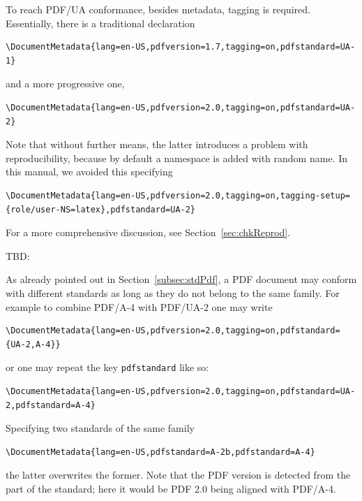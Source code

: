 To reach PDF/UA conformance, besides metadata, tagging is required. 
Essentially, there is a traditional declaration 
%
\begin{Verbatim}[fontsize=\small]
\DocumentMetadata{lang=en-US,pdfversion=1.7,tagging=on,pdfstandard=UA-1}
\end{Verbatim}
%
and a more progressive one, 
%
\begin{Verbatim}[fontsize=\small]
\DocumentMetadata{lang=en-US,pdfversion=2.0,tagging=on,pdfstandard=UA-2}
\end{Verbatim}

Note that without further means, the latter introduces a problem with reproducibility, 
because by default a namespace is added with random name. 
In this manual, we avoided this specifying 
%
\begin{Verbatim}[fontsize=\small]
\DocumentMetadata{lang=en-US,pdfversion=2.0,tagging=on,tagging-setup={role/user-NS=latex},pdfstandard=UA-2}
\end{Verbatim}
%
For a more comprehensive discussion, see Section~\ref{sec:chkReprod}. 


TBD\@: 


As already pointed out in Section~\ref{subsec:stdPdf}, 
a PDF document may conform with different standards 
as long as they do not belong to the same family. 
For example to combine PDF/A-4 with PDF/UA-2 one may write 
%
\begin{Verbatim}[fontsize=\small]
\DocumentMetadata{lang=en-US,pdfversion=2.0,tagging=on,pdfstandard={UA-2,A-4}}
\end{Verbatim}
%
or one may repeat the key \texttt{pdfstandard} like so: 
%
\begin{Verbatim}[fontsize=\small]
\DocumentMetadata{lang=en-US,pdfversion=2.0,tagging=on,pdfstandard=UA-2,pdfstandard=A-4}
\end{Verbatim}

Specifying two standards of the same family 
%
\begin{Verbatim}[fontsize=\small]
\DocumentMetadata{lang=en-US,pdfstandard=A-2b,pdfstandard=A-4}
\end{Verbatim}
%
the latter overwrites the former. 
Note that the PDF version is detected from the part of the standard; 
here it would be PDF 2.0 being aligned with PDF/A-4. 




